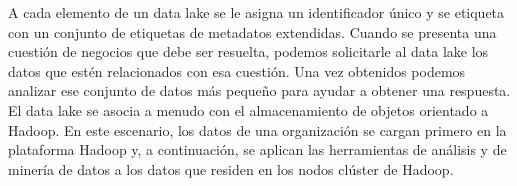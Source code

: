 \documentclass[preprint,12pt]{elsarticle}
\begin{document}
A cada elemento de un data lake se le asigna un identificador único y se etiqueta con un conjunto de etiquetas de metadatos extendidas. Cuando se presenta una cuestión de negocios que debe ser resuelta, podemos solicitarle al data lake los datos que estén relacionados con esa cuestión. Una vez obtenidos podemos analizar ese conjunto de datos más pequeño para ayudar a obtener una respuesta.\\

El data lake se asocia a menudo con el almacenamiento de objetos orientado a Hadoop. En este escenario, los datos de una organización se cargan primero en la plataforma Hadoop y, a continuación, se aplican las herramientas de análisis y de minería de datos a los datos que residen en los nodos clúster de Hadoop. \\
\end{document}
